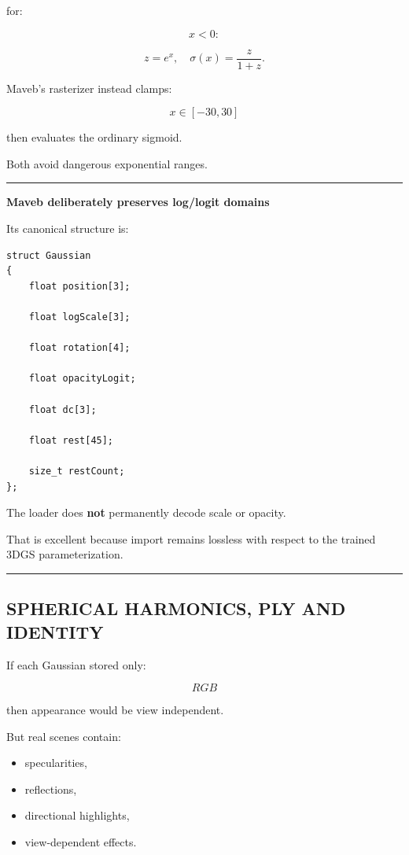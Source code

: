 for:

\[
x<0:
\]

\[
z=e^x,
\quad
\sigma(x)=\frac{z}{1+z}.
\]

Maveb's rasterizer instead clamps:

\[
x\in[-30,30]
\]

then evaluates the ordinary sigmoid.

Both avoid dangerous exponential ranges.

\begin{center}\rule{0.5\linewidth}{0.5pt}\end{center}

\textbf{Maveb deliberately preserves log/logit domains}

Its canonical structure is:

\begin{verbatim}
struct Gaussian
{
    float position[3];

    float logScale[3];

    float rotation[4];

    float opacityLogit;

    float dc[3];

    float rest[45];

    size_t restCount;
};
\end{verbatim}

The loader does \textbf{not} permanently decode scale or opacity.

That is excellent because import remains lossless with respect to the trained 3DGS parameterization.

\begin{center}\rule{0.5\linewidth}{0.5pt}\end{center}

\subsection{SPHERICAL HARMONICS, PLY AND IDENTITY}\label{04-visual-computing-ii-ch037-spherical-harmonics-ply-and-identity}

If each Gaussian stored only:

\[
RGB
\]

then appearance would be view independent.

But real scenes contain:

\begin{itemize}
\tightlist
\item
  specularities,
\item
  reflections,
\item
  directional highlights,
\item
  view-dependent effects.
\end{itemize}

